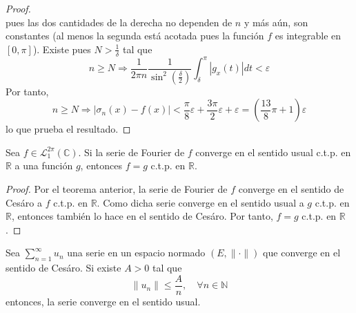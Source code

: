 \documentclass[12pt]{report}
\theoremstyle{largebreak}
\renewcommand{\leq}{\ensuremath{\leqslant}}
\renewcommand{\geq}{\ensuremath{\geqslant}}
\newcommand\abs[1]{\ensuremath{\left|#1\right|}}
\newcommand\norm[1]{\ensuremath{\|#1\|}}
\begin{document}
\begin{proof}
\begin{equation*}
        \end{equation*}
        pues las dos cantidades de la derecha no dependen de $n$ y más aún, son constantes (al menos la segunda está acotada pues la función $f$ es integrable en $[0,\pi]$). Existe pues $N>\frac{1}{\delta}$ tal que
        \begin{equation*}
            n\geq N\Rightarrow\frac{1}{2\pi n}\frac{1}{\sin^2\left(\frac{\delta}{2} \right)}\int_\delta^{\pi}\abs{g_x(t)}dt<\varepsilon
        \end{equation*}
        Por tanto,
        \begin{equation*}
            n\geq N\Rightarrow\abs{\sigma_n(x)-f(x)}<\frac{\pi}{8}\varepsilon+\frac{3\pi}{2}\varepsilon+\varepsilon=\left(\frac{13}{8}\pi+1 \right)\varepsilon
        \end{equation*}
        lo que prueba el resultado.
    \end{proof}

    \begin{cor}
        Sea $f\in\mathcal{L}_1^{2\pi}(\mathbb{C})$. Si la serie de Fourier de $f$ converge en el sentido usual c.t.p. en $\mathbb{R}$ a una función $g$, entonces $f=g$ c.t.p. en $\mathbb{R}$.
    \end{cor}

    \begin{proof}
        Por el teorema anterior, la serie de Fourier de $f$ converge en el sentido de Cesáro a $f$ c.t.p. en $\mathbb{R}$. Como dicha serie converge en el sentido usual a $g$ c.t.p. en $\mathbb{R}$, entonces también lo hace en el sentido de Cesáro. Por tanto, $f=g$ c.t.p. en $\mathbb{R}$.
    \end{proof}
    
    \begin{theor}
        Sea $\sum_{ n=1}^\infty u_n$ una serie en un espacio normado $(E,\norm{\cdot})$ que converge en el sentido de Cesáro. Si existe $A>0$ tal que
        \begin{equation*}
            \norm{u_n}\leq\frac{A}{n},\quad\forall n\in\mathbb{N}
        \end{equation*}
        entonces, la serie converge en el sentido usual.
    \end{theor}
\end{document}
